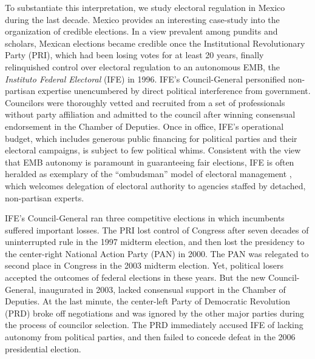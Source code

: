 \documentclass[12 pt, letter]{article}
\begin{document}
To substantiate this interpretation, we study electoral regulation
in Mexico during the last decade.  Mexico provides an interesting
case-study into the organization of credible elections.  In a view
prevalent among pundits and scholars, Mexican elections became
credible once the Institutional Revolutionary Party (PRI), which had
been losing votes for at least 20 years, finally relinquished
control over electoral regulation to an autonomous EMB, the
\emph{Instituto Federal Electoral} (IFE) in 1996. IFE's
Council-General personified non-partisan expertise unencumbered by
direct political interference from government. Councilors were
thoroughly vetted and recruited from a set of professionals without
party affiliation and admitted to the council after winning
consensual endorsement in the Chamber of Deputies. Once in office,
IFE's operational budget, which includes generous public financing
for political parties and their electoral campaigns, is subject to
few political whims.  Consistent with the view that EMB autonomy is
paramount in guaranteeing fair elections, IFE is often heralded as
exemplary of the ``ombudsman'' model of electoral management
\citep{Eisenstadt2004}, which welcomes delegation of electoral
authority to agencies staffed by detached, non-partisan experts.

IFE's Council-General ran three competitive elections in which
incumbents suffered important losses. The PRI lost control of
Congress after seven decades of uninterrupted rule in the 1997
midterm election, and then lost the presidency to the center-right
National Action Party (PAN) in 2000. The PAN was relegated to second
place in Congress in the 2003 midterm election. Yet, political
losers accepted the outcomes of federal elections in these years.
But the new Council-General, inaugurated in 2003, lacked consensual
support in the Chamber of Deputies.  At the last minute, the
center-left Party of Democratic Revolution (PRD) broke off
negotiations and was ignored by the other major parties during the
process of  councilor selection.  The PRD immediately accused IFE of
lacking autonomy from political parties, and then failed to concede
defeat in the 2006 presidential election.
\end{document}
